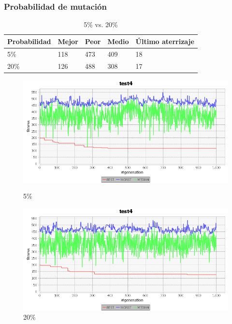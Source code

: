 \documentclass[a4paper,12pt,titlepage]{article}
\begin{document}
\newpage

\subsubsection{Probabilidad de mutación}

\begin{table}[!ht]
\centering
\begin{tabular}{@{}lllll@{}}
\toprule
Probabilidad & Mejor & Peor & Medio & Último aterrizaje \\ \midrule
5\%          & 118   & 473  & 409   & 18                \\
20\%         & 126   & 488  & 308   & 17                \\ \bottomrule
\end{tabular}
\caption{5\% vs. 20\%}
\end{table}

\begin{figure}[!ht]
\centering
\begin{minipage}{.5\textwidth}
  \centering
  \includegraphics[width=\textwidth]{5mut.png}
  \caption{5\%}
\end{minipage}%
\begin{minipage}{.5\textwidth}
  \centering
  \includegraphics[width=\textwidth]{20mut.png}
  \caption{20\%}
\end{minipage}
\end{figure}
\end{document}
